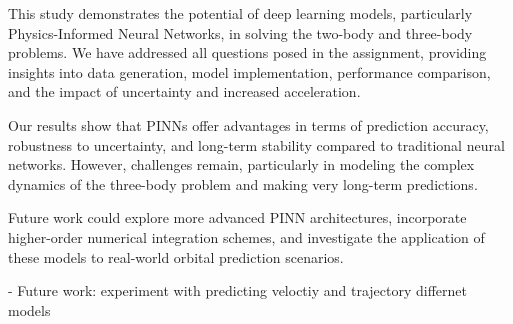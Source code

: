 \documentclass[12pt,a4paper]{article}
\begin{document}
This study demonstrates the potential of deep learning models, particularly Physics-Informed Neural Networks, in solving the two-body and three-body problems. We have addressed all questions posed in the assignment, providing insights into data generation, model implementation, performance comparison, and the impact of uncertainty and increased acceleration.

Our results show that PINNs offer advantages in terms of prediction accuracy, robustness to uncertainty, and long-term stability compared to traditional neural networks. However, challenges remain, particularly in modeling the complex dynamics of the three-body problem and making very long-term predictions.

Future work could explore more advanced PINN architectures, incorporate higher-order numerical integration schemes, and investigate the application of these models to real-world orbital prediction scenarios.

- Future work: experiment with predicting veloctiy and trajectory differnet models



\appendix
\end{document}
